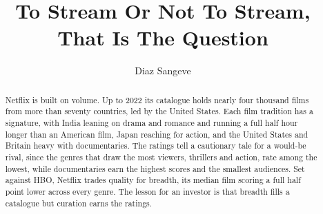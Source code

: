 \documentclass[11pt,preprint]{elsarticle}
\numberwithin{equation}{section}
\numberwithin{figure}{section}
\numberwithin{table}{section}
\begin{document}
\begin{frontmatter}  %

\title{To Stream Or Not To Stream, That Is The Question}





\author[Add1]{Diaz Sangeve}





\address[Add1]{Stellenbosch University, Stellenbosch, South Africa}


\begin{abstract}
\small{
Netflix is built on volume. Up to 2022 its catalogue holds nearly four
thousand films from more than seventy countries, led by the United
States. Each film tradition has a signature, with India leaning on drama
and romance and running a full half hour longer than an American film,
Japan reaching for action, and the United States and Britain heavy with
documentaries. The ratings tell a cautionary tale for a would-be rival,
since the genres that draw the most viewers, thrillers and action, rate
among the lowest, while documentaries earn the highest scores and the
smallest audiences. Set against HBO, Netflix trades quality for breadth,
its median film scoring a full half point lower across every genre. The
lesson for an investor is that breadth fills a catalogue but curation
earns the ratings.
}
\end{abstract}

\vspace{1cm}





\vspace{0.5cm}

\end{frontmatter}

\setcounter{footnote}{0}


\renewcommand{\contentsname}{Table of Contents}
{\tableofcontents}

\pagestyle{fancy}
\chead{}
\rhead{}
\lfoot{}
\lhead{}
\cfoot{}

\end{document}
